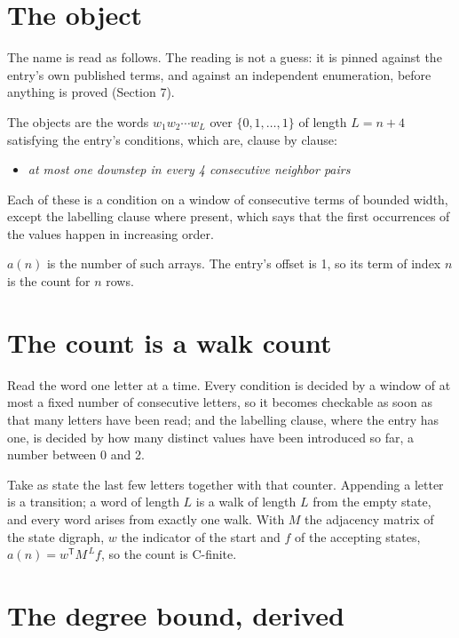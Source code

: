 \documentclass[11pt]{article}
\theoremstyle{definition}
\begin{document}
\section{The object}

The name is read as follows. The reading is not a guess: it is pinned against the entry's own published terms, and against an independent enumeration, before anything is proved (Section 7).

The objects are the words $w_1 w_2 \cdots w_L$ over $\{0,1,\dots,1\}$ of length $L = n + 4$ satisfying the entry's conditions, which are, clause by clause:

\begin{itemize}

\item {\itshape at most one downstep in every 4 consecutive neighbor pairs}

\end{itemize}

Each of these is a condition on a window of consecutive terms of bounded width, except the labelling clause where present, which says that the first occurrences of the values happen in increasing order.

$a(n)$ is the number of such arrays. The entry's offset is 1, so its term of index $n$ is the count for $n$ rows.

\section{The count is a walk count}

Read the word one letter at a time. Every condition is decided by a window of at most a fixed number of consecutive letters, so it becomes checkable as soon as that many letters have been read; and the labelling clause, where the entry has one, is decided by how many distinct values have been introduced so far, a number between $0$ and 2.

Take as state the last few letters together with that counter. Appending a letter is a transition; a word of length $L$ is a walk of length $L$ from the empty state, and every word arises from exactly one walk. With $M$ the adjacency matrix of the state digraph, $w$ the indicator of the start and $f$ of the accepting states, $a(n) = w^{\mathsf T}M^{\,L}f$, so the count is C-finite.

\section{The degree bound, derived}
\end{document}
